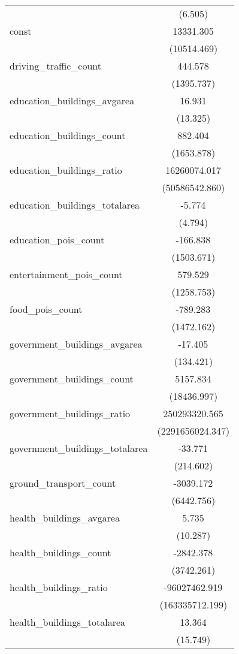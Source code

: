 \begin{table}[!htbp]
\begin{tabular}{@{\extracolsep{5pt}}lc}
  & (6.505) \\
 const & 13331.305$^{}$ \\
  & (10514.469) \\
 driving_traffic_count & 444.578$^{}$ \\
  & (1395.737) \\
 education_buildings_avgarea & 16.931$^{}$ \\
  & (13.325) \\
 education_buildings_count & 882.404$^{}$ \\
  & (1653.878) \\
 education_buildings_ratio & 16260074.017$^{}$ \\
  & (50586542.860) \\
 education_buildings_totalarea & -5.774$^{}$ \\
  & (4.794) \\
 education_pois_count & -166.838$^{}$ \\
  & (1503.671) \\
 entertainment_pois_count & 579.529$^{}$ \\
  & (1258.753) \\
 food_pois_count & -789.283$^{}$ \\
  & (1472.162) \\
 government_buildings_avgarea & -17.405$^{}$ \\
  & (134.421) \\
 government_buildings_count & 5157.834$^{}$ \\
  & (18436.997) \\
 government_buildings_ratio & 250293320.565$^{}$ \\
  & (2291656024.347) \\
 government_buildings_totalarea & -33.771$^{}$ \\
  & (214.602) \\
 ground_transport_count & -3039.172$^{}$ \\
  & (6442.756) \\
 health_buildings_avgarea & 5.735$^{}$ \\
  & (10.287) \\
 health_buildings_count & -2842.378$^{}$ \\
  & (3742.261) \\
 health_buildings_ratio & -96027462.919$^{}$ \\
  & (163335712.199) \\
 health_buildings_totalarea & 13.364$^{}$ \\
  & (15.749) \\

\end{tabular}
\end{table}
